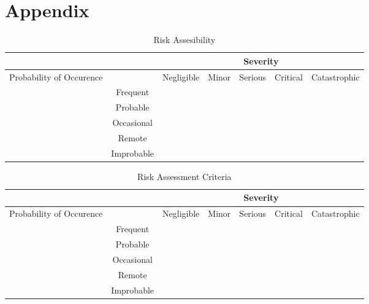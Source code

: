 
% 
\chapter{Appendix}
\begin{table}[h!]
\begin{center}
    \begin{tabular}{ |c|c|c|c|c|c|c| }
    \hline
    &&\multicolumn{5}{c|}{Severity}\\
    \hline
    Probability of Occurence&&Negligible&Minor&Serious&Critical&Catastrophic\\
    \hline
    &Frequent&&&&&\\
    \hline
    &Probable&&&&&\\
    \hline
    &Occasional&&&&&\\
    \hline
    &Remote&&&&&\\
    \hline
    &Improbable&&&&&\\
    \hline
\end{tabular} 
\caption{Risk Assesibility}
\label{tab:Figure}

\end{center}
\end{table}
\begin{table}[h!]
    \begin{center}
        \begin{tabular}{ |c|c|c|c|c|c|c| }
        \hline
        &&\multicolumn{5}{c|}{Severity}\\
        \hline
        Probability of Occurence&&Negligible&Minor&Serious&Critical&Catastrophic\\
        \hline
        &Frequent&&&\cellcolor{gray}&\cellcolor{gray}&\cellcolor{gray}\\
        \hline
        &Probable&&&\cellcolor{gray}&\cellcolor{gray}&\cellcolor{gray}\\
        \hline
        &Occasional&&&&\cellcolor{gray}&\cellcolor{gray}\\
        \hline
        &Remote&&&&\cellcolor{gray}&\cellcolor{gray}\\
        \hline
        &Improbable&&&&\cellcolor{gray}&\cellcolor{gray}\\
        \hline
    \end{tabular} 
    \caption{Risk Assessment Criteria}
    \label{tab:Figure}
    
    \end{center}
    \end{table}
